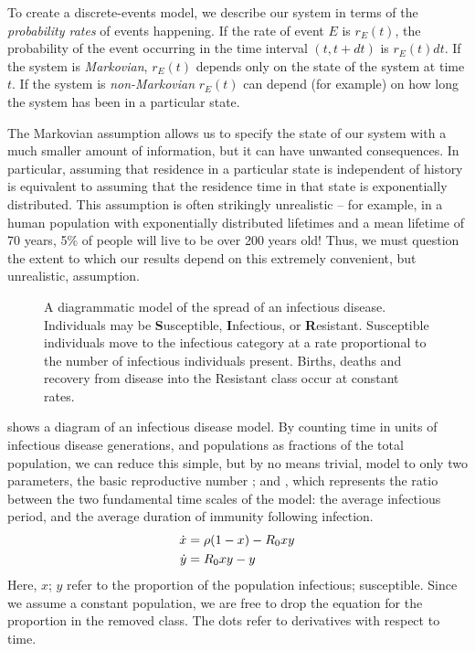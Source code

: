 \documentclass{amsproc}
\theoremstyle{definition}
\theoremstyle{remark}
\numberwithin{equation}{section}
\begin{document}
To create a discrete-events model, we describe our system in terms of the {\em probability rates} of events happening. 
If the rate of event $E$ is $r_E(t)$, the probability of the event occurring in the time interval $(t, t+dt)$ is $r_E(t) dt$. 
If the system is {\em Markovian}, $r_E(t)$ depends only on the state of the system at time $t$. 
If the system is {\em non-Markovian} $r_E(t)$ can depend (for example) on how long the system has been in a particular state.

The Markovian assumption allows us to specify the state of our system with a much smaller amount of information, but it can have unwanted consequences.  
In particular, assuming that residence in a particular state is independent of history is equivalent to assuming that the residence time in that state is exponentially distributed.
This assumption is often strikingly unrealistic -- for example, in a human population with exponentially distributed lifetimes and a mean lifetime of 70 years, 5\% of people will live to be over 200 years old!  
Thus, we must question the extent to which our results depend on this extremely convenient, but unrealistic, assumption.

\begin{figure}

\caption[Box model]{
%
	A diagrammatic model of the spread of an infectious disease.  
	Individuals may be {\bf S}usceptible, {\bf I}nfectious, or {\bf R}esistant.
	Susceptible individuals move to the infectious category at a rate proportional to the number of infectious individuals present.  
	Births, deaths and recovery from disease into the Resistant class occur at constant rates.
%
}
\end{figure}

 shows a diagram of an infectious disease model.  
By counting time in units of infectious disease generations, and populations as fractions of the total population, we can reduce this simple, but by no means trivial, model to only two parameters, the basic reproductive number \Ro; and \ro, which represents the ratio between the two fundamental time scales of the model: the average infectious period, and the average duration of immunity following infection.
\begin{equation}
	\begin{split}
		\dot x &= \rho(1-x) - R_0 xy \\
		\dot y &= R_0 xy - y
	\end{split}
	\eqlab{ode}
\end{equation}
Here, $x$; $y$ refer to the proportion of the population infectious; susceptible.  
Since we assume a constant population, we are free to drop the equation for the proportion in the removed class.  The dots refer to derivatives with respect to time.
\end{document}
